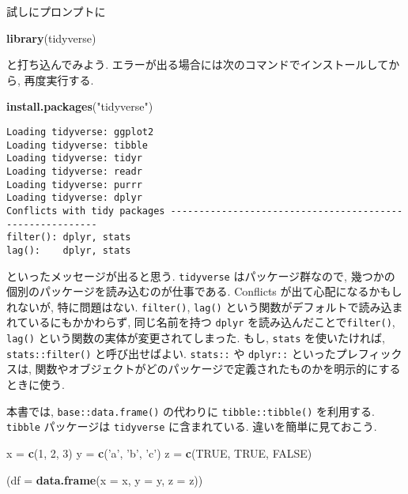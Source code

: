 \documentclass[a4paper]{scrbook}
\newenvironment{Shaded}{\begin{snugshade}}{\end{snugshade}}
\newcommand{\KeywordTok}[1]{\textcolor[rgb]{0.13,0.29,0.53}{\textbf{{#1}}}}
\newcommand{\DataTypeTok}[1]{\textcolor[rgb]{0.13,0.29,0.53}{{#1}}}
\newcommand{\DecValTok}[1]{\textcolor[rgb]{0.00,0.00,0.81}{{#1}}}
\newcommand{\StringTok}[1]{\textcolor[rgb]{0.31,0.60,0.02}{{#1}}}
\newcommand{\OtherTok}[1]{\textcolor[rgb]{0.56,0.35,0.01}{{#1}}}
\newcommand{\NormalTok}[1]{{#1}}
\theoremstyle{definition}
\begin{document}
試しにプロンプトに

\begin{Shaded}
\begin{Highlighting}[]
\KeywordTok{library}\NormalTok{(tidyverse)}
\end{Highlighting}
\end{Shaded}

と打ち込んでみよう.
エラーが出る場合には次のコマンドでインストールしてから, 再度実行する.

\begin{Shaded}
\begin{Highlighting}[]
\KeywordTok{install.packages}\NormalTok{(}\StringTok{"tidyverse"}\NormalTok{)}
\end{Highlighting}
\end{Shaded}

\begin{verbatim}
Loading tidyverse: ggplot2
Loading tidyverse: tibble
Loading tidyverse: tidyr
Loading tidyverse: readr
Loading tidyverse: purrr
Loading tidyverse: dplyr
Conflicts with tidy packages ---------------------------------------------------------
filter(): dplyr, stats
lag():    dplyr, stats
\end{verbatim}

といったメッセージが出ると思う. \texttt{tidyverse} はパッケージ群なので,
幾つかの個別のパッケージを読み込むのが仕事である. Conflicts
が出て心配になるかもしれないが, 特に問題はない. \texttt{filter()},
\texttt{lag()} という関数がデフォルトで読み込まれているにもかかわらず,
同じ名前を持つ \texttt{dplyr} を読み込んだことで\texttt{filter()},
\texttt{lag()} という関数の実体が変更されてしまった. もし,
\texttt{stats} を使いたければ, \texttt{stats::filter()}
と呼び出せばよい. \texttt{stats::} や \texttt{dplyr::}
といったプレフィックスは,
関数やオブジェクトがどのパッケージで定義されたものかを明示的にするときに使う.

本書では, \texttt{base::data.frame()} の代わりに
\texttt{tibble::tibble()} を利用する. \texttt{tibble} パッケージは
\texttt{tidyverse} に含まれている. 違いを簡単に見ておこう.

\begin{Shaded}
\begin{Highlighting}[]
\NormalTok{x =}\StringTok{ }\KeywordTok{c}\NormalTok{(}\DecValTok{1}\NormalTok{, }\DecValTok{2}\NormalTok{, }\DecValTok{3}\NormalTok{)}
\NormalTok{y =}\StringTok{ }\KeywordTok{c}\NormalTok{(}\StringTok{'a'}\NormalTok{, }\StringTok{'b'}\NormalTok{, }\StringTok{'c'}\NormalTok{)}
\NormalTok{z =}\StringTok{ }\KeywordTok{c}\NormalTok{(}\OtherTok{TRUE}\NormalTok{, }\OtherTok{TRUE}\NormalTok{, }\OtherTok{FALSE}\NormalTok{)}

\NormalTok{(}\DataTypeTok{df =} \KeywordTok{data.frame}\NormalTok{(}\DataTypeTok{x =} \NormalTok{x, }\DataTypeTok{y =} \NormalTok{y, }\DataTypeTok{z =} \NormalTok{z))}
\end{Highlighting}
\end{Shaded}
\end{document}
